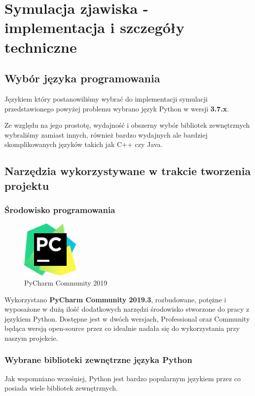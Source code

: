 \chapter{Symulacja zjawiska - implementacja i szczegóły techniczne}

\section{Wybór języka programowania}

Językiem który postanowiliśmy wybrać do implementacji symulacji przedstawionego powyżej problemu wybrano język Python w wersji \textbf{3.7.x}.

Ze względu na jego prostotę, wydajność i obszerny wybór bibliotek zewnętrznych wybraliśmy zamiast innych, również bardzo wydajnych ale bardziej skomplikowanych języków takich jak C++ czy Java.


\section{Narzędzia wykorzystywane w trakcie tworzenia projektu}
\begingroup
\subsection{Środowisko programowania}
\begin{figure}

	\centering
	\includegraphics[width=0.25\textwidth]{PyCharm_Logo.png}
	\caption{\label{fig:frog2}PyCharm Community 2019}

\end{figure}

Wykorzystano \textbf{PyCharm Community 2019.3}, rozbudowane, potężne i wyposażone w dużą ilość dodatkowych narzędzi środowisko stworzone do pracy z językiem Python. Dostępne jest w dwóch wersjach, Professional oraz Community będąca wersją open-source przez co idealnie nadała się do wykorzystania przy naszym projekcie.

\endgroup
\clearpage

\subsection{Wybrane biblioteki zewnętrzne języka Python}
Jak wspomniano wcześniej, Python jest bardzo popularnym językiem przez co posiada wiele bibliotek zewnętrznych.

